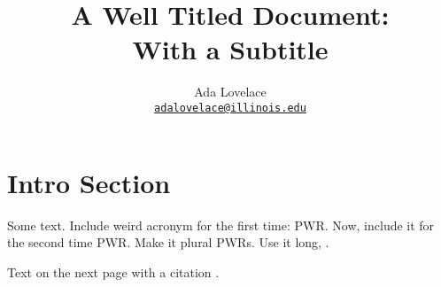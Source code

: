 \documentclass[letterpaper]{article}
\author{Ada Lovelace
        \\ \href{mailto:adalovelace@illinois.edu}{\texttt{adalovelace@illinois.edu}}
}
\date{}
\title{A Well Titled Document:\\
With a Subtitle}
\begin{document}
\maketitle
\section{Intro Section}
Some text. Include weird acronym for the first time: \gls{PWR}.
Now, include it for the second time \gls{PWR}.
Make it plural \glspl{PWR}.
Use it long, .

\pagebreak

Text on the next page with a  citation \cite{whitesides_whitesides_2004}.




\end{document}
